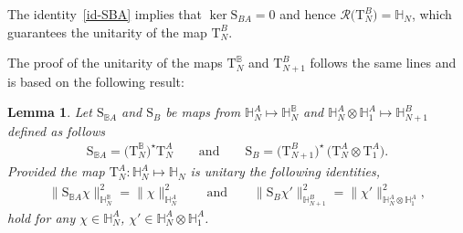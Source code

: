 \documentclass[11pt]{article}
\numberwithin{equation}{section}
\numberwithin{equation}{section}
\newtheorem{Lemma}[Theorem]{Lemma}
\begin{document}
The identity~\eqref{id-SBA} implies that $\ker \mathrm S_{BA}=0$ and hence $\mathcal R\big(\mathrm T_N^B\big)=\mathbb H_N$, which guarantees the
unitarity of the map $\mathrm T_N^B$.

The proof of the unitarity of the maps $\mathrm T_N^{\mathbb B}$ and $\mathrm T_{N+1}^B$ follows the same lines and is based on the
following result:

\begin{Lemma}\label{lemma:SBBA}
Let $\mathrm S_{\mathbb B A}$ and $\mathrm S_{B}$ be maps from $\mathbb H_N^A \mapsto \mathbb H^{\mathbb B}_N$ and
$\mathbb H^{A}_N\otimes \mathbb H_{1}^A \mapsto \mathbb H^{B}_{N+1}$ defined as follows
\begin{gather*}
\mathrm S_{\mathbb B A}=\big(\mathrm T_N^{\mathbb B}\big)^{\star} \mathrm T_N^{A}\qquad \text{and}\qquad
\mathrm S_{B}=\big(\mathrm T_{N+1}^{B}\big)^{\star}\,
\big(\mathrm T_{N}^A\otimes \mathrm T_1^A\big).
\end{gather*}
Provided the map $\mathrm T_N^A\colon \mathbb H^{A}_N \mapsto \mathbb H_N$ is unitary the following identities,
\begin{gather*}
\|\mathrm S_{\mathbb B A}\chi\|^2_{\mathbb H_N^{\mathbb B}}=\|\chi\|^2_{\mathbb H_N^A}
\qquad \text{and} \qquad
\|\mathrm S_{B }\chi'\|^2_{\mathbb H_{N+1}^{ B}}=\|\chi'\|^2_{\mathbb H_N^A\otimes \mathbb H_1^A},
\end{gather*}
hold for any $\chi\in\mathbb H_N^A$, $\chi'\in \mathbb H_N^A\otimes \mathbb H_1^A$.
\end{Lemma}
\end{document}
